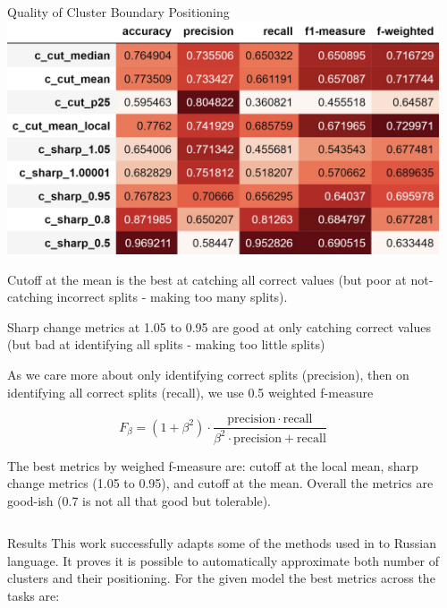 \documentclass[xcolor=table]{beamer}
\newlength{\sepwidth}
\newcommand{\separatorcolumn}{\begin{column}{\sepwidth}\end{column}}
\begin{document}
\begin{frame}[t]
\begin{columns}[t]
\begin{column}{0.4\paperwidth}
\begin{block}{Quality of Cluster Boundary Positioning}
            \includegraphics[scale=0.9]{pic/metrics_of_positioning_table.png}
            
            \alert{Cutoff at the mean} is the best at catching all correct values (but poor at not-catching incorrect splits - making too many splits).
            
            \alert{Sharp change metrics at 1.05 to 0.95} are good at only catching correct values (but bad at identifying all splits - making too little splits)
            
            As we care more about only identifying correct splits (precision), then on identifying all correct splits (recall), we use 0.5 weighted f-measure
            
            $${\displaystyle F_{\beta }=(1+\beta ^{2})\cdot {\frac {\mathrm {precision} \cdot \mathrm {recall} }{\beta ^{2}\cdot \mathrm {precision} +\mathrm {recall} }}}$$
            
            The best metrics by weighed f-measure are: \alert{cutoff at the local mean}, sharp change metrics (1.05 to 0.95), and cutoff at the mean.  Overall the metrics are good-ish (0.7 is not all that good but tolerable).
        \end{block}
    \end{column}
    \separatorcolumn
\end{columns}
\begin{columns}[t]
    \begin{column}{0.3\paperwidth}
        \begin{block}{Results}
        This work successfully adapts some of the methods used in \cite{kim2019} to Russian language. It proves it is possible to automatically approximate both number of clusters and their positioning. For the given model the best metrics across the tasks are:
        

\end{block}
\end{column}
\end{columns}
\end{frame}
\end{document}
